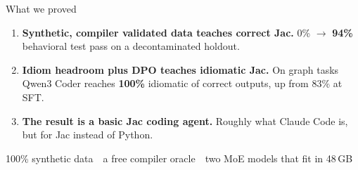 \documentclass[aspectratio=169,11pt]{beamer}
\begin{document}
\begin{frame}{What we proved}
  \begin{enumerate}
    \item \textbf{Synthetic, compiler validated data teaches correct Jac.} 0\%
          $\rightarrow$ \textbf{94\%} behavioral test pass on a decontaminated holdout.
    \item \textbf{Idiom headroom plus DPO teaches idiomatic Jac.} On graph tasks Qwen3 Coder
          reaches \textbf{100\%} idiomatic of correct outputs, up from 83\% at SFT.
    \item \textbf{The result is a basic Jac coding agent.} Roughly what Claude Code is, but for
          Jac instead of Python.
  \end{enumerate}
  \vspace{3mm}
  \begin{center}\small\color{soft}
    100\% synthetic data \,\textbullet\, a free compiler oracle \,\textbullet\, two MoE models that fit in 48\,GB
  \end{center}
\end{frame}
\end{document}
